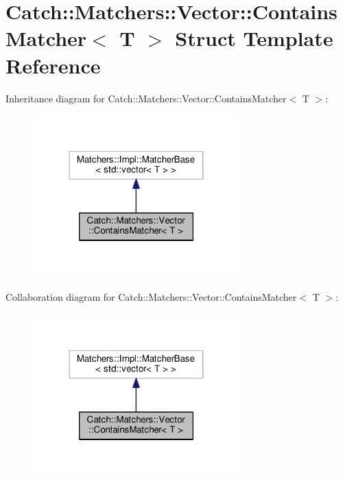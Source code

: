 \hypertarget{structCatch_1_1Matchers_1_1Vector_1_1ContainsMatcher}{}\section{Catch\+:\+:Matchers\+:\+:Vector\+:\+:Contains\+Matcher$<$ T $>$ Struct Template Reference}
\label{structCatch_1_1Matchers_1_1Vector_1_1ContainsMatcher}


Inheritance diagram for Catch\+:\+:Matchers\+:\+:Vector\+:\+:Contains\+Matcher$<$ T $>$\+:\nopagebreak
\begin{figure}[H]
\begin{center}
\leavevmode
\includegraphics[width=226pt]{structCatch_1_1Matchers_1_1Vector_1_1ContainsMatcher__inherit__graph}
\end{center}
\end{figure}


Collaboration diagram for Catch\+:\+:Matchers\+:\+:Vector\+:\+:Contains\+Matcher$<$ T $>$\+:\nopagebreak
\begin{figure}[H]
\begin{center}
\leavevmode
\includegraphics[width=226pt]{structCatch_1_1Matchers_1_1Vector_1_1ContainsMatcher__coll__graph}
\end{center}
\end{figure}
